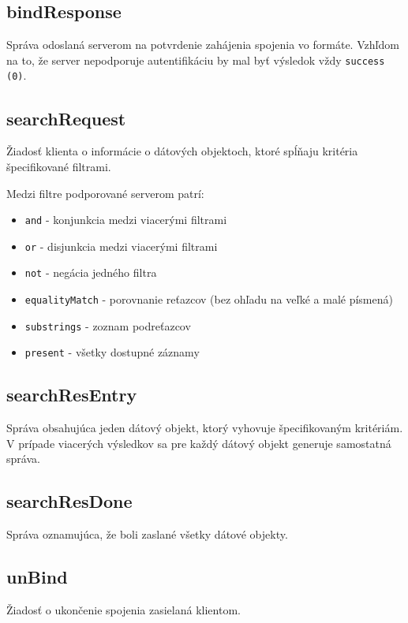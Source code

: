 \documentclass[12pt]{report}
\begin{document}
\subsection{bindResponse}

Správa odoslaná serverom na potvrdenie zahájenia spojenia vo formáte. Vzhľdom na to, že server
nepodporuje autentifikáciu by mal byť výsledok vždy \texttt{success (0)}.

\subsection{searchRequest}

Žiadosť klienta o informácie o dátových objektoch, ktoré spĺňaju kritéria špecifikované filtrami.

Medzi filtre podporované serverom patrí:
\begin{itemize}
    \item \texttt{and} - konjunkcia medzi viacerými filtrami
    \item \texttt{or} - disjunkcia medzi viacerými filtrami
    \item \texttt{not} - negácia jedného filtra
    \item \texttt{equalityMatch} - porovnanie reťazcov (bez ohľadu na veľké a malé písmená)
    \item \texttt{substrings} - zoznam podreťazcov
    \item \texttt{present} - všetky dostupné záznamy
\end{itemize}

\subsection{searchResEntry}

Správa obsahujúca jeden dátový objekt, ktorý vyhovuje špecifikovaným kritériám.
V prípade viacerých výsledkov sa pre každý dátový objekt generuje samostatná správa.

\subsection{searchResDone}

Správa oznamujúca, že boli zaslané všetky dátové objekty.

\subsection{unBind}

Žiadosť o ukončenie spojenia zasielaná klientom.
\end{document}
